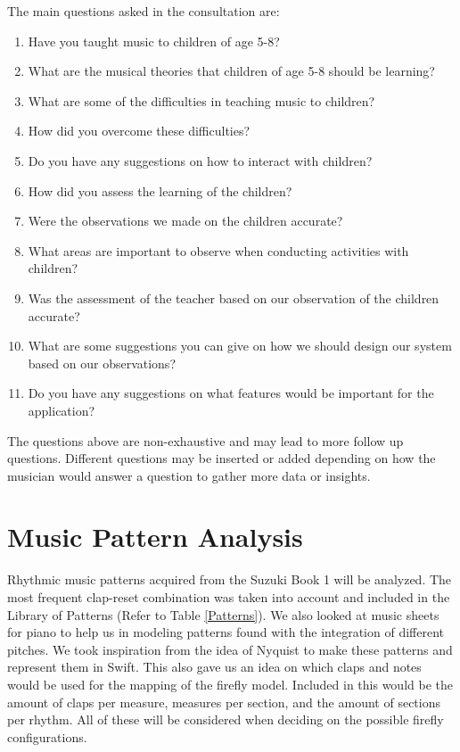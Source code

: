 The main questions asked in the consultation are:
\begin{enumerate}
    \item Have you taught music to children of age 5-8?
    \item What are the musical theories that children of age 5-8 should be learning?
    \item What are some of the difficulties in teaching music to children?
    \item How did you overcome these difficulties?
    \item Do you have any suggestions on how to interact with children?
    \item How did you assess the learning of the children?
    \item Were the observations we made on the children accurate?
    \item What areas are important to observe when conducting activities with children?
    \item Was the assessment of the teacher based on our observation of the children accurate?
    \item What are some suggestions you can give on how we should design our system based on our observations?
    \item Do you have any suggestions on what features would be important for the application?
\end{enumerate}

The questions above are non-exhaustive and may lead to more follow up questions. Different questions may be inserted or added depending on how the musician would answer a question to gather more data or insights.

\section{Music Pattern Analysis}
Rhythmic music patterns acquired from the Suzuki Book 1 will be analyzed. The most frequent clap-reset combination was taken into account and included in the Library of Patterns (Refer to Table \ref{Patterns}). We also looked at music sheets for piano to help us in modeling patterns found with the integration of different pitches. We took inspiration from the idea of Nyquist to make these patterns and represent them in Swift. This also gave us an idea on which claps and notes would be used for the mapping of the firefly model. Included in this would be the amount of claps per measure, measures per section, and the amount of sections per rhythm. All of these will be considered when deciding on the possible firefly configurations.

